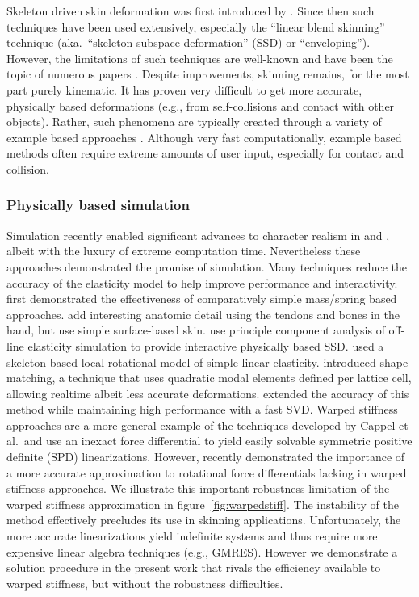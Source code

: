 Skeleton driven skin deformation was first introduced by \cite{Magnenat-Thalmann89}. Since then such techniques have been used extensively, especially the ``linear blend skinning'' technique (aka.\ ``skeleton subspace deformation'' (SSD) or ``enveloping''). However, the limitations of such techniques are well-known and have been the topic of numerous papers \cite{Wang02,Merry06,Kavan08}. Despite improvements, skinning remains, for the most part purely kinematic. It has proven very difficult to get more accurate, physically based deformations (e.g., from self-collisions and contact with other objects). Rather, such phenomena are typically created through a variety of example based approaches \cite{Lewis00,Sloan01}. Although very fast computationally, example based methods often require extreme amounts of user input, especially for contact and collision.
		\subsubsection{Physically based simulation}		
Simulation recently enabled significant advances to character realism in \cite{Irving:2008:SDF} and \cite{clutterbuck:2010:avatar}, albeit with the luxury of extreme computation time. Nevertheless these approaches demonstrated the promise of simulation. Many techniques reduce the accuracy of the elasticity model to help improve performance and interactivity. \cite{Waters90,Chadwick89} first demonstrated the effectiveness of comparatively simple mass/spring based approaches. \cite{Sueda:2008} add interesting anatomic detail using the tendons and bones in the hand, but use simple surface-based skin. \cite{Kry02} use principle component analysis of off-line elasticity simulation to provide interactive physically based SSD. \cite{capell:2005:pb,Capell:2002:ISD:566570.566622,Galopo07} used a skeleton based local rotational model of simple linear elasticity. \cite{Muller:2005:MDB} introduced shape matching, a technique that uses quadratic modal elements defined per lattice cell, allowing realtime albeit less accurate deformations. \cite{Rivers:2007:FFL} extended the accuracy of this
method while maintaining high performance with a fast SVD. Warped stiffness approaches \cite{Muller:2002:SRD,Muller:2004:IVM} are a more general example of the techniques developed by Cappel et al.\ and use an inexact force differential to yield easily solvable symmetric positive definite (SPD) linearizations. However, \cite{Chao:2010:SGM} recently demonstrated the importance of a more accurate approximation to rotational force differentials lacking in warped stiffness approaches. We  illustrate this important robustness limitation of the warped stiffness approximation in figure~\ref{fig:warpedstiff}. The instability of the method effectively precludes its use in skinning applications. Unfortunately, the more accurate linearizations  yield indefinite systems and thus require more expensive linear algebra techniques (e.g., GMRES). However we demonstrate a solution procedure in the present work that rivals the efficiency available to warped stiffness, but without the robustness difficulties.

